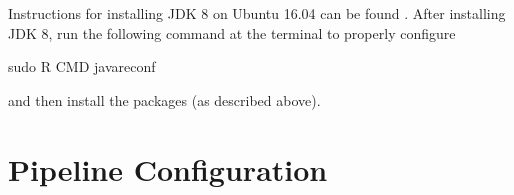 \documentclass[letterpaper,12pt,english]{sphinxmanual}
\begin{document}
Instructions for installing JDK 8 on Ubuntu 16.04 can be found .
After installing JDK 8, run the following command at the terminal to properly configure 

%
\begin{sphinxVerbatim}[commandchars=\\\{\}]
\PYGZdl{} sudo R CMD javareconf
\end{sphinxVerbatim}

and then install the  packages (as described above).


\chapter{Pipeline Configuration}
\end{document}
